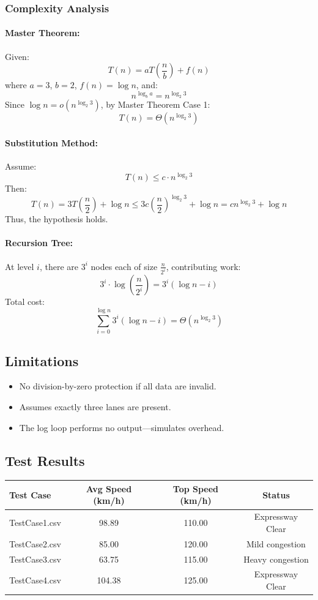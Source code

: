 \documentclass[12pt]{article}
\begin{document}
\subsubsection{Complexity Analysis}

\paragraph{Master Theorem:} Given:
\[
T(n) = aT\left(\frac{n}{b}\right) + f(n)
\]
where \( a = 3 \), \( b = 2 \), \( f(n) = \log n \), and:
\[
n^{\log_b a} = n^{\log_2 3}
\]
Since \( \log n = o(n^{\log_2 3}) \), by Master Theorem Case 1:
\[
T(n) = \Theta(n^{\log_2 3})
\]

\paragraph{Substitution Method:} Assume:
\[
T(n) \le c \cdot n^{\log_2 3}
\]
Then:
\[
T(n) = 3T\left(\frac{n}{2}\right) + \log n \le 3c \left(\frac{n}{2}\right)^{\log_2 3} + \log n = c n^{\log_2 3} + \log n
\]
Thus, the hypothesis holds.

\paragraph{Recursion Tree:} At level \( i \), there are \( 3^i \) nodes each of size \( \frac{n}{2^i} \), contributing work:
\[
3^i \cdot \log\left(\frac{n}{2^i}\right) = 3^i(\log n - i)
\]
Total cost:
\[
\sum_{i=0}^{\log n} 3^i(\log n - i) = \Theta(n^{\log_2 3})
\]

\subsection{Limitations}
\begin{itemize}
    \item No division-by-zero protection if all data are invalid.
    \item Assumes exactly three lanes are present.
    \item The log loop performs no output—simulates overhead.
\end{itemize}

\subsection{Test Results}

\begin{table}[H]
\centering
\begin{tabular}{@{}lccc@{}}
\toprule
\textbf{Test Case} & \textbf{Avg Speed (km/h)} & \textbf{Top Speed (km/h)} & \textbf{Status} \\
\midrule
TestCase1.csv & 98.89 & 110.00 & Expressway Clear \\
TestCase2.csv & 85.00 & 120.00 & Mild congestion \\
TestCase3.csv & 63.75 & 115.00 & Heavy congestion \\
TestCase4.csv & 104.38 & 125.00 & Expressway Clear \\
\bottomrule
\end{tabular}
\end{table}
\end{document}
